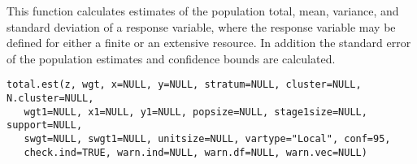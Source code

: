 \begin{Description}\relax
This function calculates estimates of the population total, mean, variance, and
standard deviation of a response variable, where the response variable may be
defined for either a finite or an extensive resource.  In addition the 
standard error of the population estimates and confidence bounds are
calculated.
\end{Description}
\begin{Usage}
\begin{verbatim}
total.est(z, wgt, x=NULL, y=NULL, stratum=NULL, cluster=NULL, N.cluster=NULL,
   wgt1=NULL, x1=NULL, y1=NULL, popsize=NULL, stage1size=NULL, support=NULL,
   swgt=NULL, swgt1=NULL, unitsize=NULL, vartype="Local", conf=95,
   check.ind=TRUE, warn.ind=NULL, warn.df=NULL, warn.vec=NULL)
\end{verbatim}
\end{Usage}
